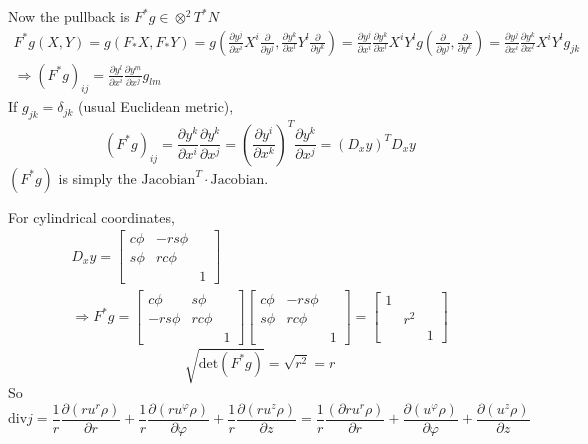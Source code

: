 \documentclass[twoside,landscape,10pt]{amsart}
\theoremstyle{plain}
\theoremstyle{definition}
\theoremstyle{remark}
\theoremstyle{remark}
\begin{document}
\begin{multicols*}{2}
Now the pullback is $F^*g \in \otimes^2T^*N$
\[
\begin{gathered}
  F^* g(X,Y) = g(F_*X, F_*Y) = g\left( \frac{ \partial y^j}{ \partial x^i }X^i \frac{ \partial }{ \partial y^j}, \frac{ \partial y^k}{ \partial x^l} Y^l \frac{ \partial }{ \partial y^k} \right) = \frac{ \partial y^j}{ \partial x^i} \frac{ \partial y^k}{\partial x^l} X^i Y^l g\left( \frac{ \partial }{ \partial y^j}, \frac{ \partial }{ \partial y^k } \right) = \frac{ \partial y^j}{ \partial x^i} \frac{ \partial y^k}{ \partial x^l} X^i Y^l g_{jk} \\
\Longrightarrow  (F^*g)_{ij} = \frac{ \partial y^l}{ \partial x^i} \frac{ \partial y^m}{ \partial x^j} g_{lm}
\end{gathered}
\]
If $g_{jk} = \delta_{jk}$ (usual Euclidean metric),
\[
(F^*g)_{ij} = \frac{ \partial y^k}{ \partial x^i } \frac{ \partial y^k}{ \partial x^j} = \left( \frac{ \partial y^i}{ \partial x^k}\right)^T \frac{ \partial y^k}{ \partial x^j} = (D_xy)^T D_xy
\]
$(F^*g)$ is simply the $\text{Jacobian}^T\cdot \text{Jacobian}$.  

For cylindrical coordinates,
\[
\begin{gathered}
  D_xy = \left[ \begin{matrix} c{\phi } & - rs{\phi} & \\ 
      s{\phi} & rc{\phi} & \\
      & & 1 \end{matrix} \right] \\ 
  \Longrightarrow F^*g = \left[ \begin{matrix} c{\phi } & s{\phi} & \\ 
      -rs{\phi} & rc{\phi} & \\
      & & 1 \end{matrix} \right] \left[ \begin{matrix} c{\phi } & - rs{\phi} & \\ 
      s{\phi} & rc{\phi} & \\
      & & 1 \end{matrix} \right]  = \left[ \begin{matrix} 1 & & \\ & r^2 & \\ & & 1 \end{matrix} \right]
\end{gathered}
\]
\[
\sqrt{ \text{det}(F^*g) } = \sqrt{r^2} =r 
\]
So
\[
\text{div}j = \frac{1}{r} \frac{ \partial (ru^r\rho ) }{ \partial r } +\frac{1}{r} \frac{ \partial (ru^{\varphi } \rho ) }{ \partial \varphi } + \frac{1}{r} \frac{ \partial (ru^z \rho ) }{ \partial z} = \frac{1}{r} \frac{ (\partial ru^r \rho  )}{ \partial r } + \frac{ \partial (u^{\varphi} \rho ) }{ \partial \varphi } + \frac{ \partial (u^z \rho ) }{ \partial z}
\]


\end{multicols*}
\end{document}
